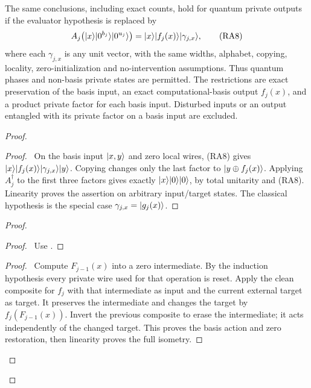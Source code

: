 \begin{theorem}
The same conclusions, including exact counts, hold for quantum
private outputs if the evaluator hypothesis is replaced by
\[
 A_j\bigl(\lvert x\rangle\lvert 0^{b_j}\rangle\lvert 0^{u_j}\rangle\bigr)
   =\lvert x\rangle\lvert f_j(x)\rangle\lvert \gamma_{j,x}\rangle,             \tag{RA8}
\]
where each $\gamma_{j,x}$ is any unit vector, with the same widths,
alphabet, copying, locality, zero-initialization and no-intervention
assumptions. Thus quantum phases and non-basis private states are
permitted. The restrictions are exact preservation of the basis input,
an exact computational-basis output $f_j(x)$, and a product private
factor for each basis input. Disturbed inputs or an output entangled
with its private factor on a basis input are excluded.
\end{theorem}
\begin{proof}
 \begin{proof}\pf\ On the basis input $\lvert x,y\rangle$ and zero local
 wires, (RA8) gives
 $\lvert x\rangle\lvert f_j(x)\rangle\lvert \gamma_{j,x}\rangle\lvert y\rangle$.
 Copying changes only the last factor to $\lvert y\oplus f_j(x)\rangle$.
 Applying $A_j^\dagger$ to the first three factors gives exactly
 $\lvert x\rangle\lvert 0\rangle\lvert 0\rangle$, by total unitarity and (RA8).
 Linearity proves the assertion on arbitrary input/target states.
 The classical hypothesis is the special case
 $\gamma_{j,x}=\lvert g_j(x)\rangle$.\end{proof}
 \begin{proof}
  \begin{proof}\pf\ Use .\end{proof}
  \begin{proof}\pf\ Compute $F_{j-1}(x)$ into a zero intermediate.
  By the induction hypothesis every private wire used for that operation
  is reset. Apply the clean composite for $f_j$ with that intermediate as
  input and the current external target as target. It preserves the
  intermediate and changes the target by $f_j(F_{j-1}(x))$.
  Invert the previous composite to erase the intermediate; it acts
  independently of the changed target. This proves the basis action
  and zero restoration, then linearity proves the full isometry.\end{proof}
  \qedstep

\end{proof}
\end{proof}
